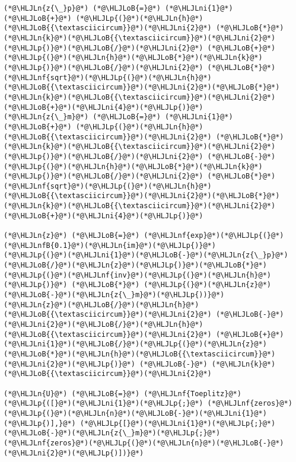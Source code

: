 \documentclass[12pt,landscape]{article}
\newcommand{\HLJLn}[1]{#1}
\newcommand{\HLJLnf}[1]{\textcolor[RGB]{66,102,213}{#1}}
\newcommand{\HLJLnfB}[1]{\textcolor[RGB]{59,151,46}{#1}}
\newcommand{\HLJLni}[1]{\textcolor[RGB]{59,151,46}{#1}}
\newcommand{\HLJLoB}[1]{\textcolor[RGB]{102,102,102}{\textbf{#1}}}
\newcommand{\HLJLp}[1]{#1}
\begin{document}
{\begin{lstlisting}
(*@\HLJLn{z{\_}p}@*) (*@\HLJLoB{=}@*) (*@\HLJLni{1}@*) (*@\HLJLoB{+}@*) (*@\HLJLp{(}@*)(*@\HLJLn{h}@*)(*@\HLJLoB{{\textasciicircum}}@*)(*@\HLJLni{2}@*) (*@\HLJLoB{*}@*) (*@\HLJLn{k}@*)(*@\HLJLoB{{\textasciicircum}}@*)(*@\HLJLni{2}@*)(*@\HLJLp{)}@*)(*@\HLJLoB{/}@*)(*@\HLJLni{2}@*) (*@\HLJLoB{+}@*) (*@\HLJLp{(}@*)(*@\HLJLn{h}@*)(*@\HLJLoB{*}@*)(*@\HLJLn{k}@*)(*@\HLJLp{)}@*)(*@\HLJLoB{/}@*)(*@\HLJLni{2}@*) (*@\HLJLoB{*}@*) (*@\HLJLnf{sqrt}@*)(*@\HLJLp{(}@*)(*@\HLJLn{h}@*)(*@\HLJLoB{{\textasciicircum}}@*)(*@\HLJLni{2}@*)(*@\HLJLoB{*}@*)(*@\HLJLn{k}@*)(*@\HLJLoB{{\textasciicircum}}@*)(*@\HLJLni{2}@*)(*@\HLJLoB{+}@*)(*@\HLJLni{4}@*)(*@\HLJLp{)}@*)
(*@\HLJLn{z{\_}m}@*) (*@\HLJLoB{=}@*) (*@\HLJLni{1}@*) (*@\HLJLoB{+}@*) (*@\HLJLp{(}@*)(*@\HLJLn{h}@*)(*@\HLJLoB{{\textasciicircum}}@*)(*@\HLJLni{2}@*) (*@\HLJLoB{*}@*) (*@\HLJLn{k}@*)(*@\HLJLoB{{\textasciicircum}}@*)(*@\HLJLni{2}@*)(*@\HLJLp{)}@*)(*@\HLJLoB{/}@*)(*@\HLJLni{2}@*) (*@\HLJLoB{-}@*) (*@\HLJLp{(}@*)(*@\HLJLn{h}@*)(*@\HLJLoB{*}@*)(*@\HLJLn{k}@*)(*@\HLJLp{)}@*)(*@\HLJLoB{/}@*)(*@\HLJLni{2}@*) (*@\HLJLoB{*}@*) (*@\HLJLnf{sqrt}@*)(*@\HLJLp{(}@*)(*@\HLJLn{h}@*)(*@\HLJLoB{{\textasciicircum}}@*)(*@\HLJLni{2}@*)(*@\HLJLoB{*}@*)(*@\HLJLn{k}@*)(*@\HLJLoB{{\textasciicircum}}@*)(*@\HLJLni{2}@*)(*@\HLJLoB{+}@*)(*@\HLJLni{4}@*)(*@\HLJLp{)}@*)

(*@\HLJLn{z}@*) (*@\HLJLoB{=}@*) (*@\HLJLnf{exp}@*)(*@\HLJLp{(}@*)(*@\HLJLnfB{0.1}@*)(*@\HLJLn{im}@*)(*@\HLJLp{)}@*)
(*@\HLJLp{(}@*)(*@\HLJLni{1}@*)(*@\HLJLoB{-}@*)(*@\HLJLn{z{\_}p}@*)(*@\HLJLoB{/}@*)(*@\HLJLn{z}@*)(*@\HLJLp{)}@*)(*@\HLJLoB{*}@*)(*@\HLJLp{(}@*)(*@\HLJLnf{inv}@*)(*@\HLJLp{(}@*)(*@\HLJLn{h}@*)(*@\HLJLp{)}@*) (*@\HLJLoB{*}@*) (*@\HLJLp{(}@*)(*@\HLJLn{z}@*)(*@\HLJLoB{-}@*)(*@\HLJLn{z{\_}m}@*)(*@\HLJLp{))}@*)
(*@\HLJLn{z}@*)(*@\HLJLoB{/}@*)(*@\HLJLn{h}@*)(*@\HLJLoB{{\textasciicircum}}@*)(*@\HLJLni{2}@*) (*@\HLJLoB{-}@*) (*@\HLJLni{2}@*)(*@\HLJLoB{/}@*)(*@\HLJLn{h}@*)(*@\HLJLoB{{\textasciicircum}}@*)(*@\HLJLni{2}@*) (*@\HLJLoB{+}@*) (*@\HLJLni{1}@*)(*@\HLJLoB{/}@*)(*@\HLJLp{(}@*)(*@\HLJLn{z}@*)(*@\HLJLoB{*}@*)(*@\HLJLn{h}@*)(*@\HLJLoB{{\textasciicircum}}@*)(*@\HLJLni{2}@*)(*@\HLJLp{)}@*) (*@\HLJLoB{-}@*) (*@\HLJLn{k}@*)(*@\HLJLoB{{\textasciicircum}}@*)(*@\HLJLni{2}@*)

(*@\HLJLn{U}@*) (*@\HLJLoB{=}@*) (*@\HLJLnf{Toeplitz}@*)(*@\HLJLp{([}@*)(*@\HLJLni{1}@*)(*@\HLJLp{;}@*) (*@\HLJLnf{zeros}@*)(*@\HLJLp{(}@*)(*@\HLJLn{n}@*)(*@\HLJLoB{-}@*)(*@\HLJLni{1}@*)(*@\HLJLp{)],}@*) (*@\HLJLp{[}@*)(*@\HLJLni{1}@*)(*@\HLJLp{;}@*) (*@\HLJLoB{-}@*)(*@\HLJLn{z{\_}m}@*)(*@\HLJLp{;}@*) (*@\HLJLnf{zeros}@*)(*@\HLJLp{(}@*)(*@\HLJLn{n}@*)(*@\HLJLoB{-}@*)(*@\HLJLni{2}@*)(*@\HLJLp{)])}@*)
\end{lstlisting}

}
\end{document}
